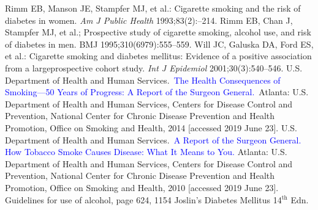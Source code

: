 \begin{thebibliography}{99}
 Rimm EB, Manson JE, Stampfer MJ, et al.: Cigarette smoking and the risk of diabetes in women. \textit{Am J Public Health} 1993;83(2):–214.
 Rimm EB, Chan J, Stampfer MJ, et al.; Prospective study of cigarette smoking, alcohol use, and risk of diabetes in men. BMJ 1995;310(6979):555–559.
 Will JC, Galuska DA, Ford ES, et al.: Cigarette smoking and dia\-betes mellitus: Evidence of a positive association from a large\break prospective cohort study. \textit{Int J Epidemiol} 2001;30(3):540–546.
 U.S. Department of Health and Human Services. \textcolor{blue}{The Health Consequences of Smoking—50 Years of Progress: A Report of the Surgeon General.} Atlanta: U.S. Department of Health and Human Services, Centers for Disease Control and Prevention, National Center for Chronic Disease Prevention and Health Promotion, Office on Smoking and Health, 2014 [accessed 2019 June 23].
 U.S. Department of Health and Human Services. \textcolor{blue}{A Report of the Surgeon General. How Tobacco Smoke Causes Disease: What It Means to You.} Atlanta: U.S. Department of Health and Human Services, Centers for Disease Control and Prevention, National Center for Chronic Disease Prevention and Health Promotion, Office on Smoking and Health, 2010 [accessed 2019 June 23].
 Guidelines for use of alcohol, page 624, 1154 Joslin’s Diabetes Mellitus 14$^{\text{th}}$ Edn.
\end{thebibliography}

